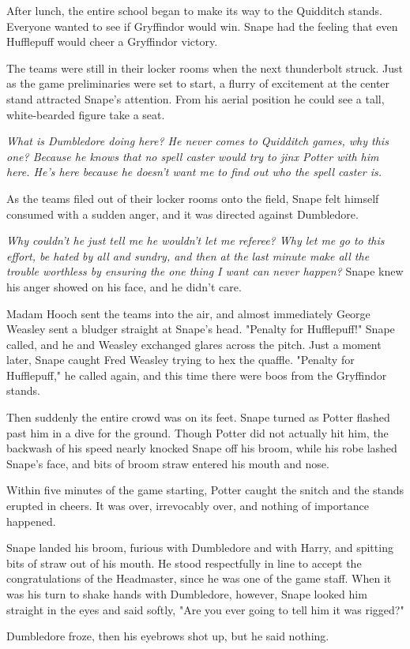 After lunch, the entire school began to make its way to the Quidditch stands. Everyone wanted to see if Gryffindor would win. Snape had the feeling that even Hufflepuff would cheer a Gryffindor victory.

The teams were still in their locker rooms when the next thunderbolt struck. Just as the game preliminaries were set to start, a flurry of excitement at the center stand attracted Snape's attention. From his aerial position he could see a tall, white-bearded figure take a seat.

\emph{What is Dumbledore doing here? He never comes to Quidditch games, why this one? {\el}Because he knows that no spell caster would try to jinx Potter with him here. He's here because he doesn't want me to find out who the spell caster is.}

As the teams filed out of their locker rooms onto the field, Snape felt himself consumed with a sudden anger, and it was directed against Dumbledore.

\emph{Why couldn't he just tell me he wouldn't let me referee? Why let me go to this effort, be hated by all and sundry, and then at the last minute make all the trouble worthless by ensuring the one thing I want can never happen?} Snape knew his anger showed on his face, and he didn't care.

Madam Hooch sent the teams into the air, and almost immediately George Weasley sent a bludger straight at Snape's head. "Penalty for Hufflepuff!" Snape called, and he and Weasley exchanged glares across the pitch. Just a moment later, Snape caught Fred Weasley trying to hex the quaffle. "Penalty for Hufflepuff," he called again, and this time there were boos from the Gryffindor stands.

Then suddenly the entire crowd was on its feet. Snape turned as Potter flashed past him in a dive for the ground. Though Potter did not actually hit him, the backwash of his speed nearly knocked Snape off his broom, while his robe lashed Snape's face, and bits of broom straw entered his mouth and nose.

Within five minutes of the game starting, Potter caught the snitch and the stands erupted in cheers. It was over, irrevocably over, and nothing of importance happened.

Snape landed his broom, furious with Dumbledore and with Harry, and spitting bits of straw out of his mouth. He stood respectfully in line to accept the congratulations of the Headmaster, since he was one of the game staff. When it was his turn to shake hands with Dumbledore, however, Snape looked him straight in the eyes and said softly, "Are you ever going to tell him it was rigged?"

Dumbledore froze, then his eyebrows shot up, but he said nothing. 


